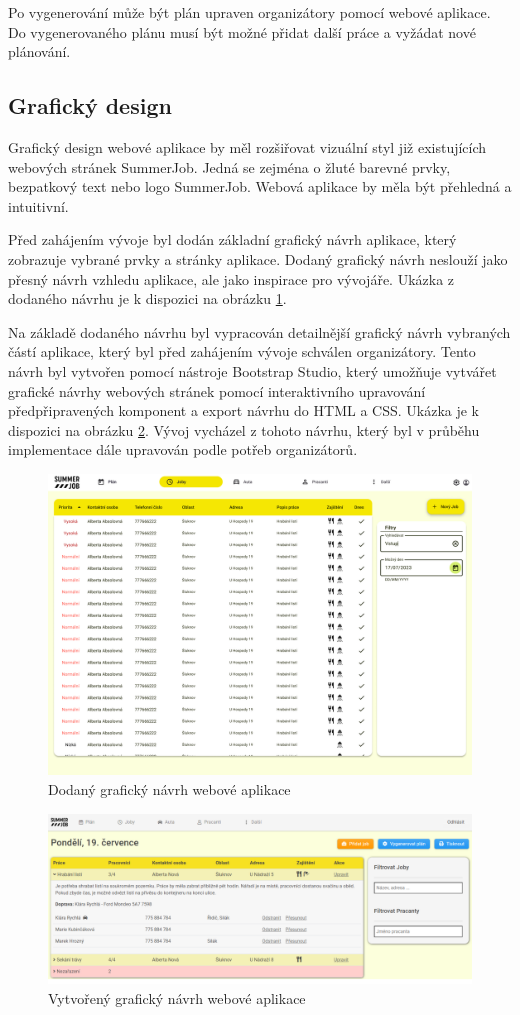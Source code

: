 Po vygenerování může být plán upraven organizátory pomocí webové aplikace. Do vygenerovaného plánu musí být možné přidat další práce a vyžádat nové plánování.

\subsection{Grafický design}

Grafický design webové aplikace by měl rozšiřovat vizuální styl již existujících webových stránek SummerJob. Jedná se zejména o žluté barevné prvky, bezpatkový text nebo
logo SummerJob. Webová aplikace by měla být přehledná a intuitivní.

Před zahájením vývoje byl dodán základní grafický návrh aplikace, který zobrazuje vybrané prvky a stránky aplikace.
Dodaný grafický návrh neslouží jako přesný návrh vzhledu aplikace, ale jako inspirace pro vývojáře. Ukázka z dodaného návrhu je k dispozici na obrázku \ref{fig:design}.

Na základě dodaného návrhu byl vypracován detailnější grafický návrh vybraných částí aplikace, který byl před zahájením vývoje schválen organizátory.
Tento návrh byl vytvořen pomocí nástroje Bootstrap Studio, který umožňuje vytvářet grafické návrhy webových stránek pomocí interaktivního
upravování předpřipravených komponent a export návrhu do HTML a CSS.
Ukázka je k dispozici na obrázku \ref{fig:design-detail}. Vývoj vycházel z tohoto návrhu, který byl v průběhu implementace dále upravován podle potřeb organizátorů.

\begin{figure}[ht]
    \centering
    \includegraphics[width=\textwidth]{chapters/images/graficky-navrh}
    \caption{Dodaný grafický návrh webové aplikace}
    \label{fig:design}
\end{figure}

\begin{figure}[ht]
    \centering
    \includegraphics[width=\textwidth]{chapters/images/bootstrap-studio}
    \caption{Vytvořený grafický návrh webové aplikace}
    \label{fig:design-detail}
\end{figure}